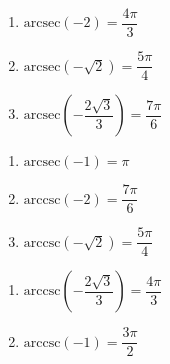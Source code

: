 \documentclass{ximera}
\begin{document}
\begin{multicols}{3} 

\begin{enumerate}

\setcounter{enumi}{\value{HW}}

\item $\mbox{arcsec} \left( -2 \right) = \dfrac{4\pi}{3}$ 
\item $\mbox{arcsec} \left( -\sqrt{2} \right) = \dfrac{5\pi}{4}$ 
\item $\mbox{arcsec} \left( -\dfrac{2\sqrt{3}}{3} \right) = \dfrac{7\pi}{6}$ 

\setcounter{HW}{\value{enumi}}

\end{enumerate}

\end{multicols}

\begin{multicols}{3} 

\begin{enumerate}

\setcounter{enumi}{\value{HW}}


\item $\mbox{arcsec} \left( -1 \right) = \pi$ 
\item $\mbox{arccsc} \left( -2 \right) = \dfrac{7\pi}{6}$ 
\item $\mbox{arccsc} \left( -\sqrt{2} \right) = \dfrac{5\pi}{4}$ 

\setcounter{HW}{\value{enumi}}

\end{enumerate}

\end{multicols}

\begin{multicols}{3} 

\begin{enumerate}

\setcounter{enumi}{\value{HW}}


\item $\mbox{arccsc} \left( -\dfrac{2\sqrt{3}}{3} \right) = \dfrac{4\pi}{3}$
\item $\mbox{arccsc} \left( -1 \right) = \dfrac{3\pi}{2}$ 

\setcounter{HW}{\value{enumi}}

\end{enumerate}

\end{multicols}
\end{document}
